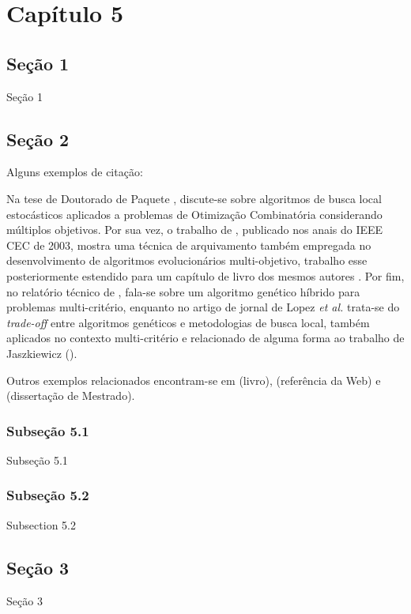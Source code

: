 \chapter{Capítulo 5}

\section{Seção 1}

Seção 1


\section{Seção 2}

Alguns exemplos de citação: 

Na tese de Doutorado de Paquete \cite{PaquetePhD}, discute-se sobre algoritmos de busca local estocásticos aplicados a problemas de Otimização Combinatória considerando múltiplos objetivos. Por sua vez, o trabalho de \cite{KnowlesBoundedLebesgue}, publicado nos anais do IEEE CEC de 2003, mostra uma técnica de arquivamento também empregada no desenvolvimento de algoritmos evolucionários multi-objetivo, trabalho esse posteriormente estendido para um capítulo de livro dos mesmos autores \cite{KnowlesBoundedPareto}. Por fim, no relatório técnico de , fala-se sobre um algoritmo genético híbrido para problemas multi-critério, enquanto no artigo de jornal de Lopez \textit{et al.} \cite{LopezPaqueteStu} trata-se do \textit{trade-off} entre algoritmos genéticos e metodologias de busca local, também aplicados no contexto multi-critério e relacionado de alguma forma ao trabalho de Jaszkiewicz (\citeyear{Jaszkiewicz}).

Outros exemplos relacionados encontram-se em \cite{Silberschatz} (livro), \cite{DB2XML} (referência da Web) e \cite{Angelo} (dissertação de Mestrado).

\subsection{Subseção 5.1}

Subseção 5.1


\subsection{Subseção 5.2}

Subsection 5.2


\section{Seção 3}

Seção 3
